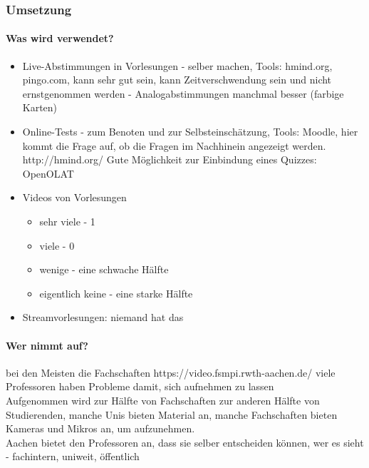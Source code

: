 	\subsubsection*{Umsetzung}
		\paragraph{Was wird verwendet?}
			\begin{itemize}
				\item Live-Abstimmungen in Vorlesungen - selber machen, Tools: hmind.org, pingo.com,
				kann sehr gut sein,
				kann Zeitverschwendung sein und nicht ernstgenommen werden - Analogabstimmungen manchmal besser (farbige Karten)

				\item Online-Tests - zum Benoten und zur Selbsteinschätzung, Tools: Moodle,
				hier kommt die Frage auf, ob die Fragen im Nachhinein angezeigt werden.
				http://hmind.org/
				Gute Möglichkeit zur Einbindung eines Quizzes: OpenOLAT

				\item Videos von Vorlesungen
					\begin{itemize}
						\item sehr viele - 1
						\item viele - 0
						\item wenige - eine schwache Hälfte
						\item eigentlich keine - eine starke Hälfte
					\end{itemize}

				\item Streamvorlesungen: niemand hat das
			\end{itemize}

	\paragraph{Wer nimmt auf?}
		bei den Meisten die Fachschaften
		https://video.fsmpi.rwth-aachen.de/
		viele Professoren haben Probleme damit, sich aufnehmen zu lassen \\

		Aufgenommen wird zur Hälfte von Fachschaften zur anderen Hälfte von Studierenden,
		manche Unis bieten Material an,
		manche Fachschaften bieten Kameras und Mikros an, um aufzunehmen. \\

		Aachen bietet den Professoren an, dass sie selber entscheiden können, wer es sieht - fachintern, uniweit, öffentlich\\

